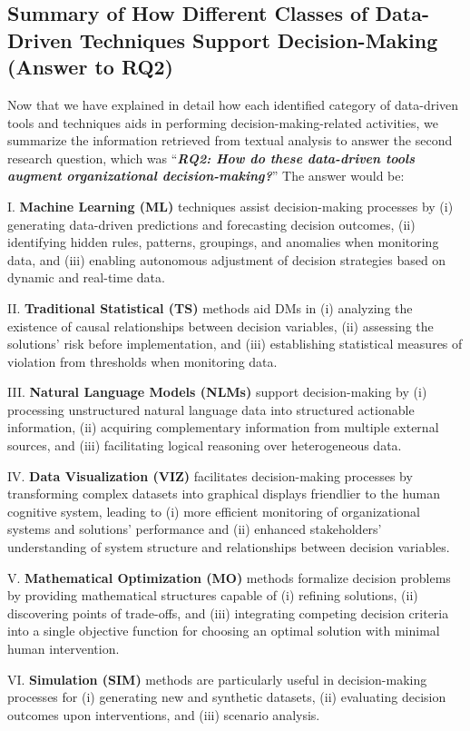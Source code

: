 \documentclass{sfuthesis}
\begin{document}
\subsection{Summary of How Different Classes of Data-Driven Techniques Support Decision-Making (Answer to RQ2)}
Now that we have explained in detail how each identified category of data-driven tools and techniques aids in performing decision-making-related activities, we summarize the information retrieved from textual analysis to answer the second research question, which was “\textbf{\textit{RQ2: How do these data-driven tools augment organizational decision-making?}}” The answer would be:\par
I.	\textbf{Machine Learning (ML)} techniques assist decision-making processes by (i) generating data-driven predictions and forecasting decision outcomes, (ii) identifying hidden rules, patterns, groupings, and anomalies when monitoring data, and (iii) enabling autonomous adjustment of decision strategies based on dynamic and real-time data.\par
II.	\textbf{Traditional Statistical (TS)} methods aid DMs in (i) analyzing the existence of causal relationships between decision variables, (ii) assessing the solutions’ risk before implementation, and (iii) establishing statistical measures of violation from thresholds when monitoring data.\par
III. \textbf{Natural Language Models (NLMs)} support decision-making by (i) processing unstructured natural language data into structured actionable information, (ii) acquiring complementary information from multiple external sources, and (iii) facilitating logical reasoning over heterogeneous data.\par
IV. \textbf{Data Visualization (VIZ)} facilitates decision-making processes by transforming complex datasets into graphical displays friendlier to the human cognitive system, leading to (i) more efficient monitoring of organizational systems and solutions’ performance and (ii) enhanced stakeholders’ understanding of system structure and relationships between decision variables.\par
V.	\textbf{Mathematical Optimization (MO)} methods formalize decision problems by providing mathematical structures capable of (i) refining solutions, (ii) discovering points of trade-offs, and (iii) integrating competing decision criteria into a single objective function for choosing an optimal solution with minimal human intervention.\par 
VI.	\textbf{Simulation (SIM)} methods are particularly useful in decision-making processes for (i) generating new and synthetic datasets, (ii) evaluating decision outcomes upon interventions, and (iii) scenario analysis.  
\end{document}
